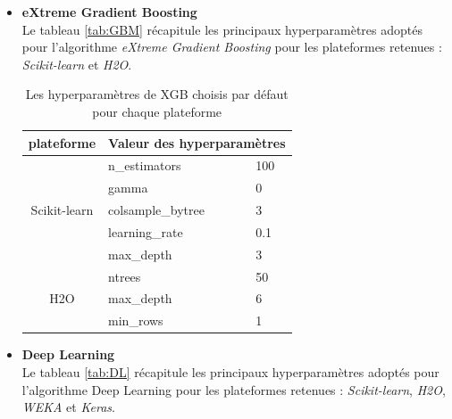 \begin{itemize}
    \item[\ding{233}]\textbf{eXtreme Gradient Boosting}\\%
        Le tableau  \ref{tab:GBM} récapitule les principaux hyperparamètres adoptés pour l'algorithme \textit{eXtreme Gradient Boosting} pour les plateformes retenues : \textit{Scikit-learn} et \textit{H2O}.\\
        \begin{table}[h!]
        \centering
        \begin{tabular}{|c||p{8cm}p{2cm}|}
        \hline
        plateforme & \multicolumn{2}{|c|}{Valeur des hyperparamètres}  \\ \hline
        \multirow{5}{*}{Scikit-learn} 
        & n\_estimators & 100  \\
        & gamma & 0 \\ 
        & colsample\_bytree & 3 \\
        & learning\_rate & 0.1\\
        & max\_depth & 3\\
         \hline
        \multirow{3}{*}{H2O} 
        & ntrees &   50 \\
        & max\_depth & 6\\
        & min\_rows &  1 \\ 
         \hline
        \end{tabular}
        \caption{Les hyperparamètres de XGB choisis par défaut pour chaque plateforme}
        \label{tab:XGB}
        \end{table}

    \item[\ding{233}]\textbf{Deep Learning}\\%
Le tableau  \ref{tab:DL} récapitule les principaux hyperparamètres adoptés pour l'algorithme Deep Learning pour les plateformes retenues : \textit{Scikit-learn}, \textit{H2O}, \textit{WEKA} et \textit{Keras}.


\end{itemize}
